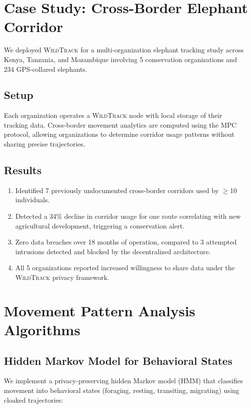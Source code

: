 \documentclass[11pt,letterpaper]{article}
\newcommand{\WildTrack}{\textsc{WildTrack}}
\begin{document}
\section{Case Study: Cross-Border Elephant Corridor}

We deployed \WildTrack{} for a multi-organization elephant tracking study across Kenya, Tanzania, and Mozambique involving 5 conservation organizations and 234 GPS-collared elephants.

\subsection{Setup}

Each organization operates a \WildTrack{} node with local storage of their tracking data. Cross-border movement analytics are computed using the MPC protocol, allowing organizations to determine corridor usage patterns without sharing precise trajectories.

\subsection{Results}

\begin{enumerate}[leftmargin=*]
    \item Identified 7 previously undocumented cross-border corridors used by $\geq$10 individuals.
    \item Detected a 34\% decline in corridor usage for one route correlating with new agricultural development, triggering a conservation alert.
    \item Zero data breaches over 18 months of operation, compared to 3 attempted intrusions detected and blocked by the decentralized architecture.
    \item All 5 organizations reported increased willingness to share data under the \WildTrack{} privacy framework.
\end{enumerate}

\section{Movement Pattern Analysis Algorithms}

\subsection{Hidden Markov Model for Behavioral States}

We implement a privacy-preserving hidden Markov model (HMM) that classifies movement into behavioral states (foraging, resting, transiting, migrating) using cloaked trajectories:
\end{document}
